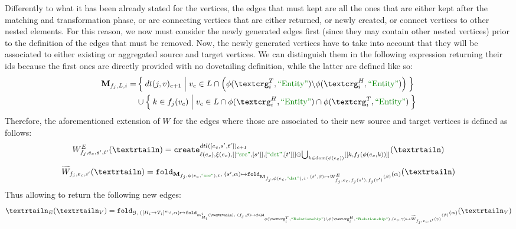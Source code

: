 Differently to what it has been already stated for the vertices, the edges that must kept are all the ones that are either kept after the matching and transformation phase, or are connecting vertices that are either returned, or newly created, or connect vertices to other nested elements. For this reason, we now must consider the newly generated edges first (since they may contain other nested vertices) prior to the definition of the edges that must be removed.
Now, the newly generated vertices have to take into account that they will be associated  to either existing or aggregated source and target vertices. We can distinguish them in the following expression returning their ids because the first ones are directly provided with no dovetailing definition, while the latter are defined like so:
\begin{equation}
\label{eq:M}
\begin{split}
\textbf{M}_{f_j,L,i} = &\Set{dt(j,v)_{c+1}|v_c\in L\cap\left( \phi(\ngraph_i^T,\ONTA)\backslash\phi(\ngraph_i^H,\ONTA)\right)}\\
&\cup\Set{k\in f_j(v_c)|v_c\in L\cap\phi(\ngraph_i^H,\ONTA)\cap\phi(\ngraph_i^T,\ONTA)}\\
\end{split}
\end{equation}
Therefore, the aforementioned extension of $W$ for the edges where those are associated to their new source and target vertices is defined as follows:
\[W_{f_j,e_c,s',t'}^E(\nested)=\texttt{create}^{dtl([e_c,s',t'])_{c+1}}_{\ell(e_c),\xi(e_c),[[\SRC,[s']],[\DST,[t']]]\oplus\bigcup_{k\in\dom(\phi(e_c))} [[k,f_j(\phi(e_c,k))]]}(\nested)\]
\begin{equation}\label{eq:Wtilde}
\widetilde{W}_{f_j,e_c,i'}(\nested) =\texttt{fold}_{\textbf{M}_{f_j,\phi(e_c,\SRC),i},\;(s',\alpha)\mapsto \texttt{fold}_{\textbf{M}_{f_j,\phi(e_c,\DST),i},\;(t',\beta)\mapsto W_{f_j,e_c,f_j(s'),f_j(t')}^E(\beta)}(\alpha)}(\nested)
\end{equation}
Thus allowing to return the following new edges:
\[\nested_E(\nested_V)=\texttt{fold}_{\mathcal{G},\;([H_i\to T_i]^{m_i},\alpha)\mapsto \texttt{fold}_{m^i_{H_i}(\nested),\;(f_j,\beta)\mapsto \texttt{fold}_{\phi(\ngraph_i^T,\RELA)\backslash\phi(\ngraph_i^H,\RELA),(e_c,\gamma)\mapsto \widetilde{W}_{f_j,e_c,i'}(\gamma)}(\beta) }(\alpha)}(\nested_V)\]
